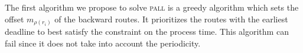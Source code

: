 \documentclass[10pt, conference, letterpaper]{IEEEtran}
\newcommand\pall{\textsc{pall}\xspace}
\begin{document}
    The first algorithm we propose to solve \pall is a greedy algorithm which sets the offset $m_{\rho(r_i)}$ of the 
    backward routes. It prioritizes the routes with the earliest deadline to best satisfy the
    constraint on the process time. 
    This algorithm can fail since it does not take into account the periodicity.
%    
%    
%     
%   
%       
\end{document}
